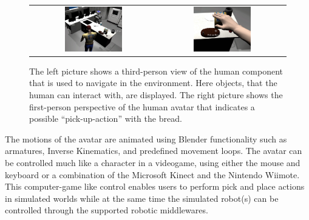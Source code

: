 \documentclass{llncs}
\begin{document}
\begin{figure}[ht!]
\centering
\begin{tabular}{cc}
 \includegraphics[width=0.475\textwidth]{pics/human_control_1.png} &
 \includegraphics[width=0.475\textwidth]{pics/human_control_2.png}
\end{tabular}
\caption{The left picture shows a third-person view of the human component that
    is used to navigate in the environment. Here objects, that the human can
    interact with, are displayed. The right picture shows the first-person
    perspective of the human avatar that indicates a possible
    ``pick-up-action'' with the bread.}
\label{fig:human_control}
\end{figure}

The motions of the avatar are animated using Blender functionality such as
armatures, Inverse Kinematics, and predefined movement loops.
The avatar can be controlled much like a character in a videogame, using either
the mouse and keyboard or a combination of the Microsoft Kinect and the
Nintendo Wiimote. This computer-game like control enables users to perform
pick and place actions in simulated worlds while at the same time the
simulated robot(s) can be controlled through the supported robotic middlewares.

\end{document}
